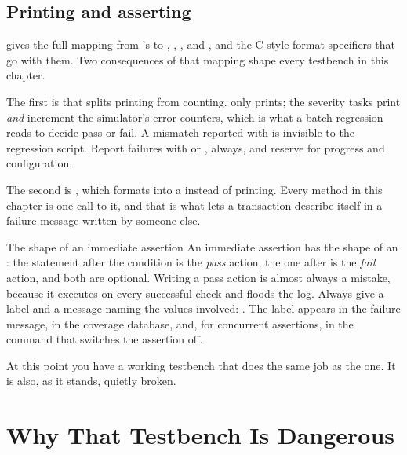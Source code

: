 \subsection{Printing and asserting}

 gives the full mapping from \VHDL{}'s
 to , ,
,  and , and the C-style format
specifiers that go with them. Two consequences of that mapping shape every
testbench in this chapter.

The first is that \SV{} splits printing from counting.  only
prints; the severity tasks print \emph{and} increment the simulator's error
counters, which is what a batch regression reads to decide pass or fail. A
mismatch reported with  is invisible to the regression script.
Report failures with  or , always, and reserve
 for progress and configuration.

The second is , which formats into a  instead of
printing. Every  method in this chapter is one call to
it, and that is what lets a transaction describe itself in a failure message
written by someone else.

\begin{notebox}{The shape of an immediate assertion}
An immediate assertion has the shape of an : the statement after the
condition is the \emph{pass} action, the one after  is the
\emph{fail} action, and both are optional. Writing a pass action is almost
always a mistake, because it executes on every successful check and floods the
log. Always give a label and a message naming the values involved:
. The
label appears in the failure message, in the coverage database, and, for
concurrent assertions, in the command that switches the assertion off.
\end{notebox}

At this point you have a working \SV{} testbench that does the same job as the
\VHDL{} one. It is also, as it stands, quietly broken.

\section{Why That Testbench Is Dangerous}
\label{sec:tb:races}

